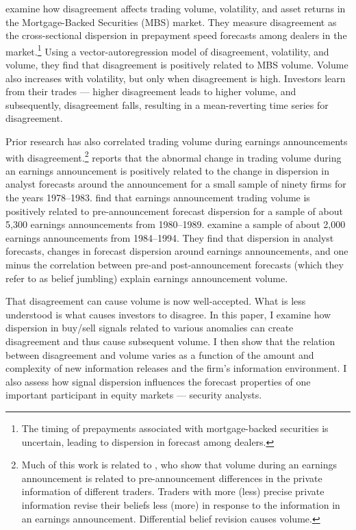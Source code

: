 \documentclass[
  12pt,
  a4paper,
  twoside,
  onecolumn]{article}
\begin{document}
\cite{carlin_etal2014} examine how disagreement affects trading volume,
volatility, and asset returns in the Mortgage-Backed Securities (MBS)
market. They measure disagreement as the cross-sectional dispersion in
prepayment speed forecasts among dealers in the market.\footnote{The
  timing of prepayments associated with mortgage-backed securities is
  uncertain, leading to dispersion in forecast among dealers.} Using a
vector-autoregression model of disagreement, volatility, and volume,
they find that disagreement is positively related to MBS volume. Volume
also increases with volatility, but only when disagreement is high.
Investors learn from their trades --- higher disagreement leads to
higher volume, and subsequently, disagreement falls, resulting in a
mean-reverting time series for disagreement.

Prior research has also correlated trading volume during earnings
announcements with disagreement.\footnote{Much of this work is related
  to \cite{kim_and_v_1991}, who show that volume during an earnings
  announcement is related to pre-announcement differences in the private
  information of different traders. Traders with more (less) precise
  private information revise their beliefs less (more) in response to
  the information in an earnings announcement. Differential belief
  revision causes volume.} \cite{ziebart_1990} reports that the abnormal
change in trading volume during an earnings announcement is positively
related to the change in dispersion in analyst forecasts around the
announcement for a small sample of ninety firms for the years
1978--1983. \cite{atiase1994} find that earnings announcement trading
volume is positively related to pre-announcement forecast dispersion for
a sample of about 5,300 earnings announcements from 1980--1989.
\cite{bamber_etal1997} examine a sample of about 2,000 earnings
announcements from 1984--1994. They find that dispersion in analyst
forecasts, changes in forecast dispersion around earnings announcements,
and one minus the correlation between pre-and post-announcement
forecasts (which they refer to as belief jumbling) explain earnings
announcement volume.

That disagreement can cause volume is now well-accepted. What is less
understood is what causes investors to disagree. In this paper, I
examine how dispersion in buy/sell signals related to various anomalies
can create disagreement and thus cause subsequent volume. I then show
that the relation between disagreement and volume varies as a function
of the amount and complexity of new information releases and the firm's
information environment. I also assess how signal dispersion influences
the forecast properties of one important participant in equity markets
--- security analysts.
\end{document}
